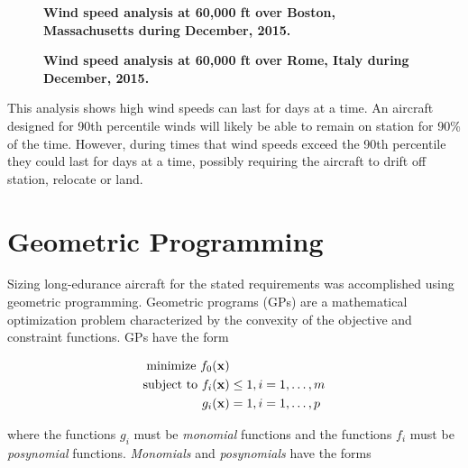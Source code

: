 \begin{figure}[H]
 \begin{subfigmatrix}{2}%
 \end{subfigmatrix}
 \caption{\textbf{Wind speed analysis at 60,000 ft over Boston, Massachusetts during December, 2015.}}
 \label{f:bostonwinds}
\end{figure}

\begin{figure}[H]
 \begin{subfigmatrix}{2}%
 \end{subfigmatrix}
 \caption{\textbf{Wind speed analysis at 60,000 ft over Rome, Italy during December, 2015.}}
 \label{f:romewinds}
\end{figure}

This analysis shows high wind speeds can last for days at a time.  
An aircraft designed for 90th percentile winds will likely be able to remain on station for 90\% of the time.  
However, during times that wind speeds exceed the 90th percentile they could last for days at a time, possibly requiring the aircraft to drift off station, relocate or land. 

\section{Geometric Programming}

Sizing long-edurance aircraft for the stated requirements was accomplished using geometric programming. 
Geometric programs (GPs) are a mathematical optimization problem characterized by the convexity of the objective and constraint functions.\cite{gp} GPs have the form

\begin{align} 
\label{e:gpform}
\text{minimize } f_0(\bold{x}) & \nonumber \\
\text{subject to  } f_i(\bold{x}) &\leq 1, i=1,\ldots,m \\
g_i (\bold{x}) &= 1, i = 1,\ldots,p 
\end{align}

where the functions $g_i$ must be \emph{monomial} functions and the functions $f_i$ must be \emph{posynomial} functions. \emph{Monomials} and \emph{posynomials} have the forms


